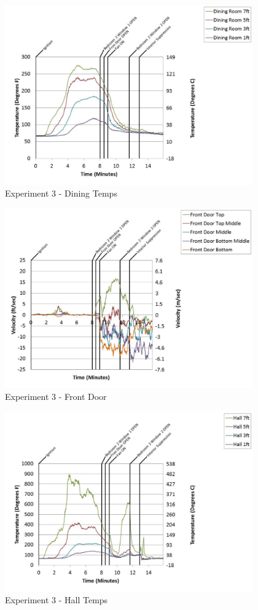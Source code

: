 \documentclass{article}
\begin{document}
\begin{appendices}
	\clearpage

	\begin{figure}[h!]
		\centering
		\includegraphics[height=3.05in]{0_Images/Results_Charts/Exp_3_Charts/DiningTemps.pdf}
		\caption{Experiment 3 - Dining Temps}
	\end{figure}
 

	\begin{figure}[h!]
		\centering
		\includegraphics[height=3.05in]{0_Images/Results_Charts/Exp_3_Charts/FrontDoor.pdf}
		\caption{Experiment 3 - Front Door}
	\end{figure}
 
	\clearpage

	\begin{figure}[h!]
		\centering
		\includegraphics[height=3.05in]{0_Images/Results_Charts/Exp_3_Charts/HallTemps.pdf}
		\caption{Experiment 3 - Hall Temps}
	\end{figure}
 


\end{appendices}
\end{document}
